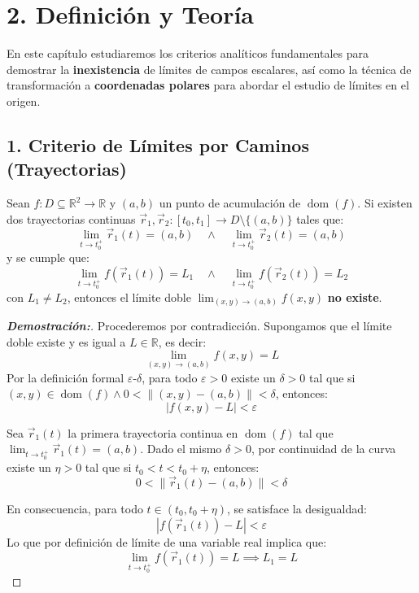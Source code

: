 \documentclass[11pt]{article}
\newenvironment{teoria}{%
  \section*{2. Definición y Teoría}%
}{}
\newenvironment{teorema}[1]{%
  \begin{tcolorbox}[colback=green!5,colframe=green!75!black,title=Teorema: #1]%
}{%
  \end{tcolorbox}%
}
\begin{document}
\begin{teoria}
  En este capítulo estudiaremos los criterios analíticos fundamentales para demostrar la \textbf{inexistencia} de límites de campos escalares, así como la técnica de transformación a \textbf{coordenadas polares} para abordar el estudio de límites en el origen.

  \subsection*{1. Criterio de Límites por Caminos (Trayectorias)}
  
  \begin{teorema}{Inexistencia por Caminos}
    Sean $f \colon D \subseteq \mathbb{R}^2 \to \mathbb{R}$ y $(a,b)$ un punto de acumulación de $\operatorname{dom}(f)$. Si existen dos trayectorias continuas $\vec{r}_1, \vec{r}_2 \colon [t_0, t_1] \to D \setminus \{(a,b)\}$ tales que:
    $$ \displaystyle\lim_{t \to t_0^+} \vec{r}_1(t) = (a,b) \quad \wedge \quad \displaystyle\lim_{t \to t_0^+} \vec{r}_2(t) = (a,b) $$
    y se cumple que:
    $$ \displaystyle\lim_{t \to t_0^+} f(\vec{r}_1(t)) = L_1 \quad \wedge \quad \displaystyle\lim_{t \to t_0^+} f(\vec{r}_2(t)) = L_2 $$
    con $L_1 \neq L_2$, entonces el límite doble $\displaystyle\lim_{(x,y) \to (a,b)} f(x,y)$ \textbf{no existe}.
  \end{teorema}

  \begin{proof}[\textbf{Demostración:}]
    Procederemos por contradicción. Supongamos que el límite doble existe y es igual a $L \in \mathbb{R}$, es decir:
    $$ \displaystyle\lim_{(x,y) \to (a,b)} f(x,y) = L $$
    Por la definición formal $\varepsilon$-$\delta$, para todo $\varepsilon > 0$ existe un $\delta > 0$ tal que si $(x,y) \in \operatorname{dom}(f) \wedge 0 < \|(x,y) - (a,b)\| < \delta$, entonces:
    $$ |f(x,y) - L| < \varepsilon $$

    Sea $\vec{r}_1(t)$ la primera trayectoria continua en $\operatorname{dom}(f)$ tal que $\displaystyle\lim_{t \to t_0^+} \vec{r}_1(t) = (a,b)$. Dado el mismo $\delta > 0$, por continuidad de la curva existe un $\eta > 0$ tal que si $t_0 < t < t_0 + \eta$, entonces:
    $$ 0 < \|\vec{r}_1(t) - (a,b)\| < \delta $$

    En consecuencia, para todo $t \in (t_0, t_0 + \eta)$, se satisface la desigualdad:
    $$ |f(\vec{r}_1(t)) - L| < \varepsilon $$
    Lo que por definición de límite de una variable real implica que:
    $$ \displaystyle\lim_{t \to t_0^+} f(\vec{r}_1(t)) = L \implies L_1 = L $$


\end{proof}
\end{teoria}
\end{document}
